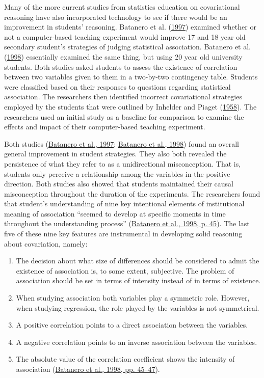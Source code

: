 \documentclass[11pt]{umnthesis}
\begin{document}
Many of the more current studies from statistics education on covariational reasoning have also incorporated technology to see if there would be an improvement in students' reasoning. Batanero et al. (\protect\hyperlink{ref-batanero:1997}{1997}) examined whether or not a computer-based teaching experiment would improve 17 and 18 year old secondary student's strategies of judging statistical association. Batanero et al. (\protect\hyperlink{ref-batanero:1998}{1998}) essentially examined the same thing, but using 20 year old university students. Both studies asked students to assess the existence of correlation between two variables given to them in a two-by-two contingency table. Students were classified based on their responses to questions regarding statistical association. The researchers then identified incorrect covariational strategies employed by the students that were outlined by Inhelder and Piaget (\protect\hyperlink{ref-inhelder:1958}{1958}). The researchers used an initial study as a baseline for comparison to examine the effects and impact of their computer-based teaching experiment.

Both studies (\protect\hyperlink{ref-batanero:1997}{Batanero et al., 1997}; \protect\hyperlink{ref-batanero:1998}{Batanero et al., 1998}) found an overall general improvement in student strategies. They also both revealed the persistence of what they refer to as a unidirectional misconception. That is, students only perceive a relationship among the variables in the positive direction. Both studies also showed that students maintained their causal misconception throughout the duration of the experiments. The researchers found that student's understanding of nine key intentional elements of institutional meaning of association ``seemed to develop at specific moments in time throughout the understanding process'' (\protect\hyperlink{ref-batanero:1998}{Batanero et al., 1998, p. 45}). The last five of these nine key features are instrumental in developing solid reasoning about covariation, namely:

\begin{enumerate}
\def\labelenumi{\arabic{enumi}.}
\setcounter{enumi}{4}
\tightlist
\item
  The decision about what size of differences should be considered to admit the existence of association is, to some extent, subjective. The problem of association should be set in terms of intensity instead of in terms of existence.
\item
  When studying association both variables play a symmetric role. However, when studying regression, the role played by the variables is not symmetrical.
\item
  A positive correlation points to a direct association between the variables.
\item
  A negative correlation points to an inverse association between the variables.
\item
  The absolute value of the correlation coefficient shows the intensity of association (\protect\hyperlink{ref-batanero:1998}{Batanero et al., 1998, pp. 45--47}).
\end{enumerate}
\end{document}
